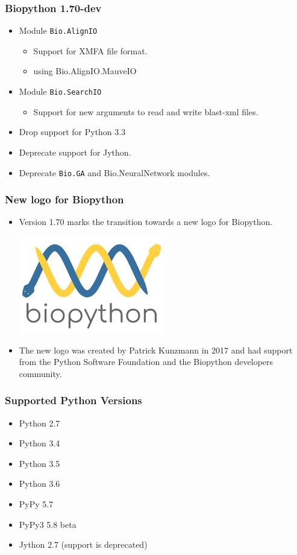 \documentclass[trans]{beamer}
\begin{document}
\frame
{
  \frametitle{Biopython 1.70-dev}

  \begin{itemize}
  \item Module \texttt{Bio.AlignIO}
  \begin{itemize}
  \item Support for XMFA file format.
  \item using Bio.AlignIO.MauveIO
  \end{itemize}
  \end{itemize}
  \begin{itemize}
  \item Module \texttt{Bio.SearchIO}
  \begin{itemize}
  \item Support for new arguments to read and write blast-xml files.
  \end{itemize}
  \item Drop support for Python 3.3
  \item Deprecate support for Jython.
  \item Deprecate \texttt{Bio.GA} and {Bio.NeuralNetwork} modules.
  \end{itemize}

}
\frame
{
  \frametitle{New logo for Biopython}

  \begin{itemize}
  \item Version 1.70 marks the transition towards a new logo for Biopython.

  \begin{center}
  \includegraphics[width=0.5\textwidth]{figures/biopython_logo_s.png}
  \end{center}

  \item The new logo was created by Patrick Kunzmann in 2017 and had support from the Python Software Foundation and the Biopython developers community.
  \end{itemize}

}
\frame
{
  \frametitle{Supported Python Versions}

  \begin{itemize}
  \item Python 2.7
  \item Python 3.4
  \item Python 3.5
  \item Python 3.6
  \item PyPy 5.7
  \item PyPy3 5.8 beta
  \item Jython 2.7 (support is deprecated)
  \end{itemize}
}
\end{document}
